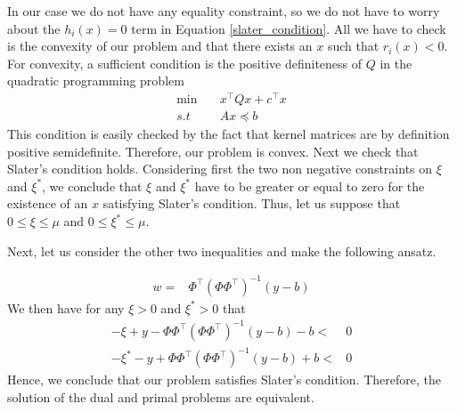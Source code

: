 In our case we do not have any equality constraint, so we do not have to worry about the $h_i(x)=0$ term in Equation \ref{slater_condition}. All we have to check is the convexity of our problem and that there exists an $x$ such that $r_i(x)<0$.
For convexity, a sufficient condition is the positive definiteness of $Q$ in the quadratic programming problem 
\begin{equation}
    \begin{aligned}
        \min \quad & x^\intercal Q x+ c^\intercal x \\        
        s.t \quad& Ax\preceq b
    \end{aligned}
\end{equation}
This condition is easily checked by the fact that kernel matrices are by definition positive semidefinite.
Therefore, our problem is convex.
Next we check that Slater's condition holds. Considering first the two non negative constraints on $\xi$ and $\xi^*$, we conclude that $\xi$  and $\xi^*$ have to be greater or equal to zero for the existence of an $x$ satisfying Slater's condition. Thus, let us suppose that $0 \leq \xi \leq \mu$ and $0 \leq \xi^* \leq \mu$.

Next, let us consider the other two inequalities and make the following ansatz.

\begin{equation}
    \begin{aligned}
        w=& \Phi^\intercal(\Phi \Phi^\intercal)^{-1} (y-b)
    \end{aligned}
\end{equation}
We then have for any $\xi > 0$ and $\xi^* > 0$  that
\begin{equation}
    \begin{aligned}
        -\xi + y -\Phi\Phi^\intercal(\Phi \Phi^\intercal)^{-1}(y-b)-b<&0
        \\
        -\xi^* - y +\Phi\Phi^\intercal(\Phi \Phi^\intercal)^{-1}(y-b)+b<&0
    \end{aligned}
\end{equation}
Hence, we conclude that our problem satisfies Slater's condition. Therefore, the solution of the dual and primal problems are equivalent.

